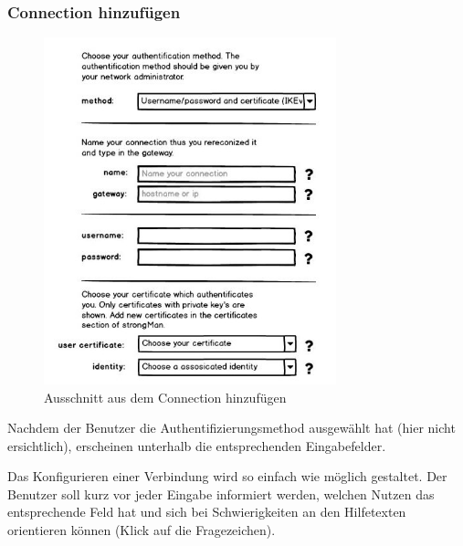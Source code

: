 \subsubsection{Connection hinzufügen}
\noindent\begin{minipage}[t]{0.55\textwidth}
\vspace{0pt}
    \begin{figure}[H]
    	\centering
    	\includegraphics[width=240pt]{images/mockups/short_con_config.jpg}
    	\caption{Ausschnitt aus dem Connection hinzufügen}
    \end{figure}
\end{minipage}
\hfill
\begin{minipage}[t]{0.45\textwidth}
\vspace{0pt}
Nachdem der Benutzer die Authentifizierungsmethod ausgewählt hat (hier nicht ersichtlich), erscheinen unterhalb die entsprechenden Eingabefelder.

Das Konfigurieren einer Verbindung wird so einfach wie möglich gestaltet. Der Benutzer soll kurz vor jeder Eingabe informiert werden, welchen Nutzen das entsprechende Feld hat und sich bei Schwierigkeiten an den Hilfetexten orientieren können (Klick auf die Fragezeichen).
\end{minipage}